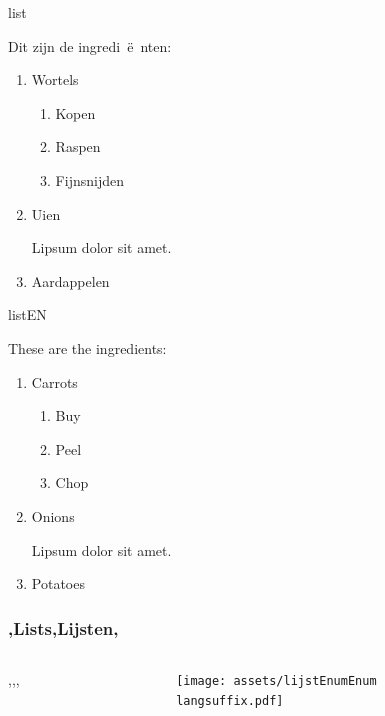     \begin{saveblock}{list}
        \begin{highlightblock}[linewidth=0.5\textwidth,gobble=8]
            Dit zijn de ingredi~\"e~nten:
            \begin{enumerate}
                \item Wortels
                \begin{enumerate}
                    \item Kopen
                    \item Raspen
                    \item Fijnsnijden
                \end{enumerate}			
                \item Uien
                
                Lipsum dolor sit amet.
                \item Aardappelen
            \end{enumerate}
        \end{highlightblock}
    \end{saveblock}

    \begin{saveblock}{listEN}
        \begin{highlightblock}[linewidth=0.5\textwidth,gobble=8]
            These are the ingredients:
            \begin{enumerate}
                \item Carrots
                \begin{enumerate}
                    \item Buy
                    \item Peel
                    \item Chop
                \end{enumerate}			
                \item Onions
                
                Lipsum dolor sit amet.
                \item Potatoes
            \end{enumerate}
        \end{highlightblock}
    \end{saveblock}

    \begin{frame}
        \frametitle{\lang,Lists,Lijsten,}
        
        \begin{columns}
            \begin{column}{0.5\textwidth}
                \lang,,,
            \end{column}
            \begin{column}{0.5\textwidth}
                \texttt{[image: assets/lijstEnumEnum\\langsuffix.pdf]}
            \end{column}
        \end{columns}
    \end{frame}

